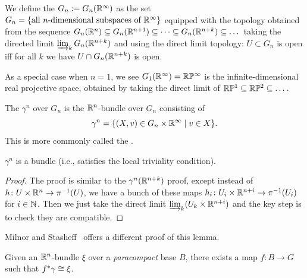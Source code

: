 \begin{definition}
We define the  $G_{n} := G_{n}(\mathbb{R}^{\infty})$
as the set $G_{n}=\{\mbox{all $n$-dimensional subspaces of }\mathbb{R}^{\infty}\}$
equipped with the topology obtained from the sequence
$G_{n}(\mathbb{R}^{n})\subseteq G_{n}(\mathbb{R}^{n+1})\subseteq\dots\subseteq G_{n}(\mathbb{R}^{n+k})\subseteq\dots$
taking the directed limit $\varinjlim_{k}G_{n}(\mathbb{R}^{n+k})$ and using
the direct limit topology: $U\subset G_{n}$ is open iff for all $k$ we
have $U\cap G_{n}(\mathbb{R}^{n+k})$ is open.
\end{definition}

\begin{remark}
As a special case when $n=1$, we see
$G_{1}(\mathbb{R}^{\infty})=\mathbb{R}\mathbb{P}^{\infty}$ is the infinite-dimensional real
projective space, obtained by taking the direct limit of $\mathbb{R}\mathbb{P}^{1}\subseteq\mathbb{R}\mathbb{P}^{2}\subseteq\dots$.
\end{remark}

\begin{definition}
The  $\gamma^{n}$ over $G_{n}$ is the
$\mathbb{R}^{n}$-bundle over $G_{n}$ consisting of
\begin{equation*}
\gamma^{n}=\{(X,v)\in G_{n}\times\mathbb{R}^{\infty}\mid v\in X\}.
\end{equation*}
This is more commonly called the .
\end{definition}

\begin{lemma}
$\gamma^{n}$ is a bundle (i.e., satisfies the local triviality condition).
\end{lemma}

\begin{proof}
The proof is similar to the $\gamma^{n}(\mathbb{R}^{n+k})$ proof, except
instead of $h\colon U\times\mathbb{R}^{n}\to\pi^{-1}(U)$, we have a bunch of
these maps $h_{i}\colon U_{i}\times\mathbb{R}^{n+i}\to\pi^{-1}(U_{i})$ for $i\in\mathbb{N}$.
Then we just take the direct limit
$\varinjlim_{k}(U_{k}\times\mathbb{R}^{n+i})$ and the key step is to check they
are compatible.
\end{proof}

\begin{remark}
Milnor and Stasheff~\cite[Lem~5.4]{milnor1974characteristic} offers a
different proof of this lemma.
\end{remark}

\begin{lemma}
Given an $\mathbb{R}^{n}$-bundle $\xi$ over a \emph{paracompact} base $B$,
there exists a map $f\colon B\to G$ such that $f^{*}\gamma\cong\xi$.
\end{lemma}

